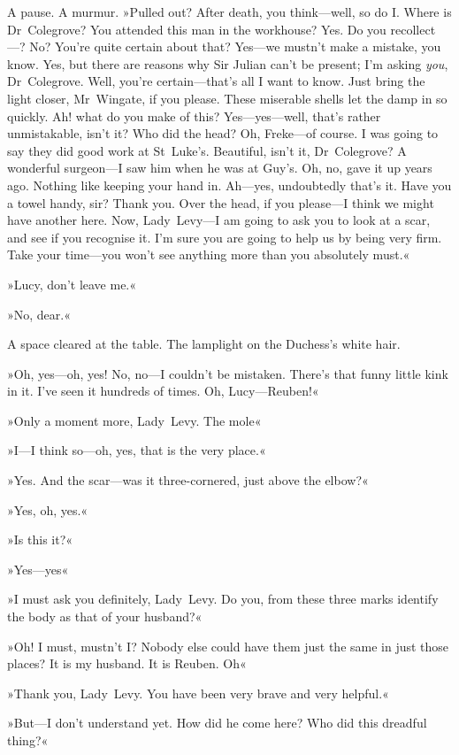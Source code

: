 A pause. A murmur. »Pulled out? After death, you think—well, so do I. Where is Dr~Colegrove? You attended this man in the workhouse? Yes. Do you recollect---? No? You're quite certain about that? Yes—we mustn't make a mistake, you know. Yes, but there are reasons why Sir Julian can't be present; I'm asking \textit{you}, Dr~Colegrove. Well, you're certain—that's all I want to know. Just bring the light closer, Mr~Wingate, if you please. These miserable shells let the damp in so quickly. Ah! what do you make of this? Yes—yes—well, that's rather unmistakable, isn't it? Who did the head? Oh, Freke—of course. I was going to say they did good work at St~Luke's. Beautiful, isn't it, Dr~Colegrove? A wonderful surgeon—I saw him when he was at Guy's. Oh, no, gave it up years ago. Nothing like keeping your hand in. Ah—yes, undoubtedly that's it. Have you a towel handy, sir? Thank you. Over the head, if you please—I think we might have another here. Now, Lady~Levy—I am going to ask you to look at a scar, and see if you recognise it. I'm sure you are going to help us by being very firm. Take your time—you won't see anything more than you absolutely must.«

»Lucy, don't leave me.«

»No, dear.«

A space cleared at the table. The lamplight on the Duchess's white hair.

»Oh, yes—oh, yes! No, no—I couldn't be mistaken. There's that funny little kink in it. I've seen it hundreds of times. Oh, Lucy—Reuben!«

»Only a moment more, Lady~Levy. The mole\longdash«

»I—I think so—oh, yes, that is the very place.«

»Yes. And the scar—was it three-cornered, just above the elbow?«

»Yes, oh, yes.«

»Is this it?«

»Yes—yes\longdash«

»I must ask you definitely, Lady~Levy. Do you, from these three marks identify the body as that of your husband?«

»Oh! I must, mustn't I? Nobody else could have them just the same in just those places? It is my husband. It is Reuben. Oh\longdash«

»Thank you, Lady~Levy. You have been very brave and very helpful.«

»But—I don't understand yet. How did he come here? Who did this dreadful thing?«

